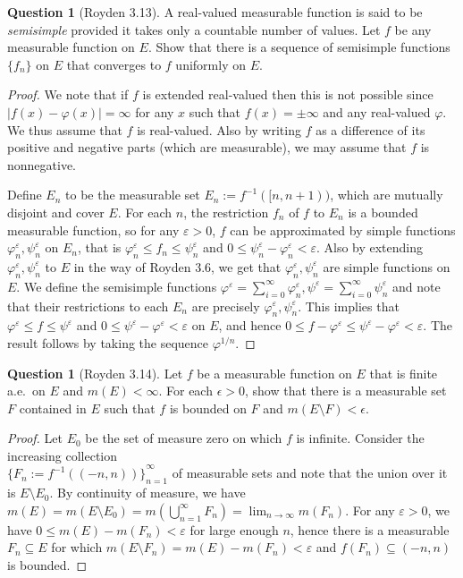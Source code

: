 \documentclass{article}
\theoremstyle{definition} %
\numberwithin{thm}{section} %
\theoremstyle{definition} %
\newtheorem{question}[thm]{Question}
\begin{document}
\begin{question}[Royden 3.13]
A real-valued measurable function is said to be \textit{semisimple} provided it takes only a countable number of values. Let $f$ be any measurable function on $E$. Show that there is a sequence of semisimple functions $\{f_n\}$ on $E$ that converges to $f$ uniformly on $E$.
\end{question}
\begin{proof}
We note that if $f$ is extended real-valued then this is not possible since $|f(x) - \varphi(x)| = \infty$ for any $x$ such that $f(x) = \pm \infty$ and any real-valued $\varphi$. We thus assume that $f$ is real-valued. Also by writing $f$ as a difference of its positive and negative parts (which are measurable), we may assume that $f$ is nonnegative.

Define $E_n$ to be the measurable set $E_n := f^{-1}([n, n + 1))$, which are mutually disjoint and cover $E$. For each $n$, the restriction $f_n$ of $f$ to $E_n$ is a bounded measurable function, so for any $\varepsilon > 0$, $f$ can be approximated by simple functions $\varphi_n^\varepsilon, \psi_n^\varepsilon$ on $E_n$, that is $\varphi_n^\varepsilon \leq f_n \leq \psi_n^\varepsilon$ and $0 \leq \psi_n^\varepsilon - \varphi_n^\varepsilon < \varepsilon$. Also by extending $\varphi_n^\varepsilon, \psi_n^\varepsilon$ to $E$ in the way of Royden 3.6, we get that $\varphi_n^\varepsilon, \psi_n^\varepsilon$ are simple functions on $E$. We define the semisimple functions $\varphi^\varepsilon = \sum_{i = 0}^\infty \varphi_n^\varepsilon, \psi^\varepsilon = \sum_{i = 0}^\infty \psi_n^\varepsilon$ and note that their restrictions to each $E_n$ are precisely $\varphi_n^\varepsilon, \psi_n^\varepsilon$. This implies that $\varphi^\varepsilon \leq f \leq \psi^\varepsilon$ and $0 \leq \psi^\varepsilon - \varphi^\varepsilon < \varepsilon$ on $E$, and hence $0 \leq f - \varphi^\varepsilon \leq \psi^\varepsilon - \varphi^\varepsilon < \varepsilon$. The result follows by taking the sequence $\varphi^{1/n}$.
\end{proof}

\begin{question}[Royden 3.14]
Let $f$ be a measurable function on $E$ that is finite a.e.\ on $E$ and $m(E) < \infty$. For each $\epsilon > 0$, show that there is a measurable set $F$ contained in $E$ such that $f$ is bounded on $F$ and $m(E \setminus F) < \epsilon$.
\end{question}
\begin{proof}
Let $E_0$ be the set of measure zero on which $f$ is infinite. Consider the increasing collection\\ ${\{F_n := f^{-1}((-n, n))\}}_{n = 1}^\infty$ of measurable sets and note that the union over it is $E \setminus E_0$. By continuity of measure, we have $m(E) = m(E \setminus E_0) = m(\bigcup_{n = 1}^\infty F_n) = \lim_{n \to \infty} m(F_n)$. For any $\varepsilon > 0$, we have $0 \leq m(E) - m(F_n) < \varepsilon$ for large enough $n$, hence there is a measurable $F_n \subseteq E$ for which $m(E \setminus F_n) = m(E) - m(F_n) < \varepsilon$ and $f(F_n) \subseteq (-n, n)$ is bounded.
\end{proof}
\end{document}
